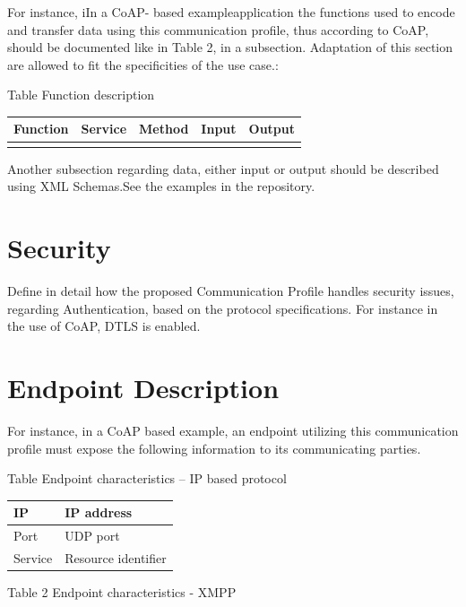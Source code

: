 \documentclass{article}
\newcounter{Table}
\renewcommand\theTable{\arabic{Table}}
\begin{document}
For instance, iIn a CoAP- based exampleapplication the functions used to encode and transfer data using this communication profile, thus according to CoAP, should be documented like in Table 2, in a subsection. Adaptation of this section are allowed to fit the specificities of the use case.:

Table \stepcounter{Table}{\theTable} Function description

\begin{flushleft}
\tablefirsthead{}
\tablehead{}
\tabletail{}
\tablelasttail{}
\begin{supertabular}{|m{1.1448599in}|m{1.1393598in}|m{1.1413599in}|m{1.1316599in}|m{1.1400598in}|}
\hline
{ Function} &
{ Service} &
{ Method} &
{ Input} &
{ Output}\\\hline
 &
 &
 &
 &
\\\hline
\end{supertabular}
\end{flushleft}
Another subsection regarding data, either input or output should be described using XML Schemas.See the examples in the repository.

\section[Security]{Security}
Define in detail how the proposed Communication Profile handles security issues, regarding Authentication, based on the protocol specifications. For instance in the use of CoAP, DTLS is enabled.

\section[Endpoint Description]{Endpoint Description}
For instance, in a CoAP based example, an endpoint utilizing this communication profile must expose the following information to its communicating parties.

Table \stepcounter{Table}{\theTable} Endpoint characteristics -- IP based protocol

\begin{flushleft}
\tablefirsthead{}
\tablehead{}
\tabletail{}
\tablelasttail{}
\begin{supertabular}{|m{1.3566599in}|m{4.57616in}|}
\hline
{ IP} &
{ IP address}\\\hline
{ Port} &
{ UDP port}\\\hline
{ Service} &
{ Resource identifier }\\\hline
\end{supertabular}
\end{flushleft}
Table 2 Endpoint characteristics - XMPP
\end{document}
